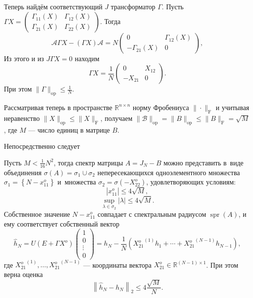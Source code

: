 Теперь найдём соответствующий \( J \)
    трансформатор \( \Gamma \).
Пусть \( \Gamma X = \begin{pmatrix}
    \Gamma_{11}(X) & \Gamma_{12}(X) \\
    \Gamma_{21}(X) & \Gamma_{22}(X)
\end{pmatrix} \).
Тогда
\[
    \mathcal{A} \Gamma X - (\Gamma X)\mathcal{A} = 
    N
    \begin{pmatrix}
        0 & \Gamma_{12}(X) \\
        -\Gamma_{21}(X) & 0
     \end{pmatrix},
     \]
Из этого и из \( J\Gamma X = 0 \) находим
    \[
        \Gamma X = \frac{1}{N} \begin{pmatrix} 0 & X_{12} \\ -X_{21} & 0 \end{pmatrix}.
        \]
При этом
    \(
        \|\Gamma\|_{\mathrm{op}} \leq \frac1N.
        \)

Рассматривая теперь в пространстве \( \mathbb{R}^{n{\times}n} \)
    норму Фробениуса \( \|\cdot\|_{\mathrm{F}} \)
    и учитывая неравенство \( \|X\|_{\mathrm{op}} \leq \|X\|_{\mathrm{F}} \),
    получаем \( \|\mathcal{B}\|_{\mathrm{op}} =
        \|B\|_{\mathrm{op}} \leq \|B\|_{\mathrm{F}} = \sqrt{M} \),
    где \( M \) --- число единиц в матрице \( B \).

Непосредственно следует
\begin{ksvthm}\label{kozlukovsv:thm:almost-all-ones}
    Пусть \( M < \frac{1}{16}N^2 \),
        тогда спектр матрицы \( A = J_N{-}B \) можно представить в~виде
        объединения \( \sigma\left(A\right) = \sigma_1 \cup \sigma_2 \)
        непересекающихся
        одноэлементного множества \( {\sigma_1 = \left\{ N{-}x_{11}^o \right\}} \)
        и~множества \( \sigma_2=\sigma(-X_{22}^o) \), удовлетворяющих условиям:
    \[
        |x_{11}^o| \leq 4\sqrt{M},
        \]
    \[
        \sup_{\lambda\in\sigma_2} |\lambda| \leq 4\sqrt{M}.
        \]
    Собственное значение \( N - x_{11}^o \) совпадает с спектральным радиусом
        \( \operatorname{spr}(A) \),
        и ему соответствует собственный вектор
        \[
            \hat{h}_N =
            U(E+\Gamma X^o)\begin{pmatrix}1\\0\\ {\vdots}\\ 0\end{pmatrix} =
            h_N -
            \frac1N (
                {X_{21}^o}^{(1)} h_1 + 
                \cdots +
                {X_{21}^o}^{(N-1)} h_{N-1}),
            \]
        где \( {X_{21}^o}^{(1)}, \ldots, {X_{21}^o}^{(N-1)} \)
        --- координаты вектора \( X_{21}^o\in\mathbb{R}^{(N{-}1){\times}1} \).
    При этом верна оценка
    \[
        \left\|\hat{h}_N - h_N \right\|_2 \leq 4\frac{\sqrt{M}}{N}.
        \]
\end{ksvthm}

